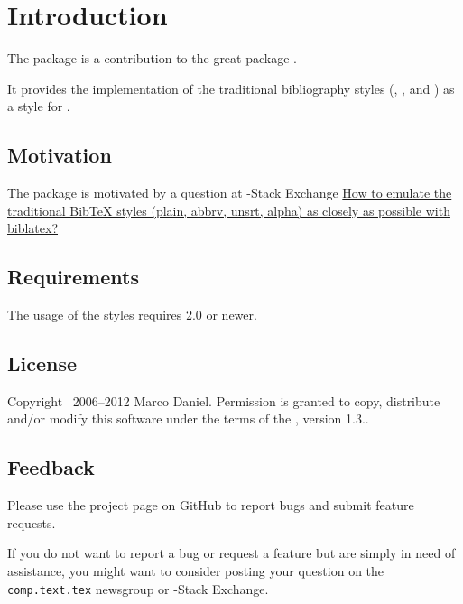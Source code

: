 \documentclass{ltxdockit}[2011/03/25]
\begin{document}
\printtitlepage
\tableofcontents


\section{Introduction}\label{sec:int}

The package  is a contribution to the great package . 

It provides the implementation of the traditional bibliography styles (,
,  and ) as a style for .

\subsection{Motivation}\label{subsec:int:mot}

The package is motivated by a question at \tex-\latex Stack Exchange \glqq \href{http://tex.stackexchange.com/}{How to emulate the traditional BibTeX styles (plain, abbrv, unsrt, alpha) as closely as possible with biblatex?}

\subsection{Requirements}

The usage of the styles requires  2.0 or newer.

\subsection{License}

Copyright \textcopyright\ 2006--2012 Marco Daniel. Permission is granted to copy, distribute and\slash or modify this software under the terms of the \lppl, version 1.3..


\subsection{Feedback}\label{subsec:int:feb}

Please use the  project page on GitHub to report bugs and submit feature requests.

If you do not want to report a bug or request a feature but are simply in need of assistance, you might want to consider posting your question on the \texttt{comp.text.tex} newsgroup or \tex-\latex Stack Exchange.
\end{document}
